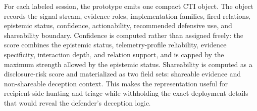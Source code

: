 For each labeled session, the prototype emits one compact CTI object. The object records the signal stream, evidence roles, implementation families, fired relations, epistemic status, confidence, actionability, recommended defensive use, and shareability boundary. Confidence is computed rather than assigned freely: the score combines the epistemic status, telemetry-profile reliability, evidence specificity, interaction depth, and relation support, and is capped by the maximum strength allowed by the epistemic status. Shareability is computed as a disclosure-risk score and materialized as two field sets: shareable evidence and non-shareable deception context. This makes the representation useful for recipient-side hunting and triage while withholding the exact deployment details that would reveal the defender's deception logic.
